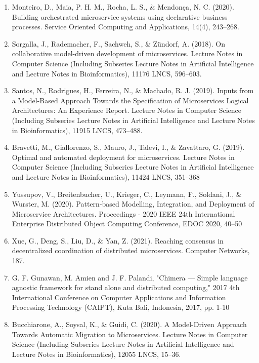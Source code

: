 \documentclass{article}
\begin{document}
\begin{enumerate}
\item Monteiro, D., Maia, P. H. M., Rocha, L. S., \& Mendonça, N. C. (2020). Building orchestrated microservice systems using declarative business processes. Service Oriented Computing and Applications, 14(4), 243–268.

\item Sorgalla, J., Rademacher, F., Sachweh, S., \& Zündorf, A. (2018). On collaborative model-driven development of microservices. Lecture Notes in Computer Science (Including Subseries Lecture Notes in Artificial Intelligence and Lecture Notes in Bioinformatics), 11176 LNCS, 596–603.

\item Santos, N., Rodrigues, H., Ferreira, N., \& Machado, R. J. (2019). Inputs from a Model-Based Approach Towards the Specification of Microservices Logical Architectures: An Experience Report. Lecture Notes in Computer Science (Including Subseries Lecture Notes in Artificial Intelligence and Lecture Notes in Bioinformatics), 11915 LNCS, 473–488.

\item Bravetti, M., Giallorenzo, S., Mauro, J., Talevi, I., \& Zavattaro, G. (2019). Optimal and automated deployment for microservices. Lecture Notes in Computer Science (Including Subseries Lecture Notes in Artificial Intelligence and Lecture Notes in Bioinformatics), 11424 LNCS, 351–368

\item Yussupov, V., Breitenbucher, U., Krieger, C., Leymann, F., Soldani, J., \& Wurster, M. (2020). Pattern-based Modelling, Integration, and Deployment of Microservice Architectures. Proceedings - 2020 IEEE 24th International Enterprise Distributed Object Computing Conference, EDOC 2020, 40–50

\item Xue, G., Deng, S., Liu, D., \& Yan, Z. (2021). Reaching consensus in decentralized coordination of distributed microservices. Computer Networks, 187.

\item G. F. Gunawan, M. Amien and J. F. Palandi, "Chimera — Simple language agnostic framework for stand alone and distributed computing," 2017 4th International Conference on Computer Applications and Information Processing Technology (CAIPT), Kuta Bali, Indonesia, 2017, pp. 1-10

\item Bucchiarone, A., Soysal, K., \& Guidi, C. (2020). A Model-Driven Approach Towards Automatic Migration to Microservices. Lecture Notes in Computer Science (Including Subseries Lecture Notes in Artificial Intelligence and Lecture Notes in Bioinformatics), 12055 LNCS, 15–36.


\end{enumerate}
\end{document}
